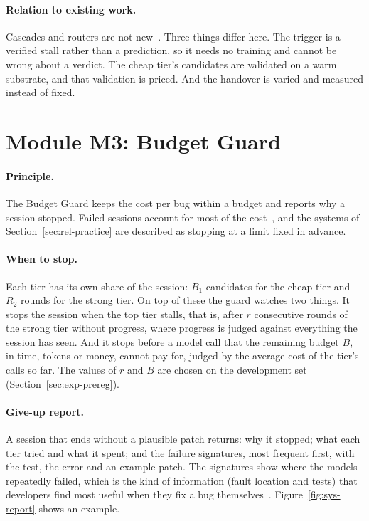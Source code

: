 \paragraph{Relation to existing work.} Cascades and routers are not
new~\citep{chen2023frugalgpt,ong2024routellm,chen2024cascading,gandhi2025strongweak,son2026swerouter,madeyski2026triage}.
Three things differ here. The trigger is a verified stall rather than a
prediction, so it needs no training and cannot be wrong about a verdict. The
cheap tier's candidates are validated on a warm substrate, and that validation
is priced. And the handover is varied and measured instead of fixed.

\section{Module M3: Budget Guard}
\label{sec:sys-guard}

\paragraph{Principle.} The Budget Guard keeps the cost per bug within a budget
and reports why a session stopped. Failed sessions account for most of the
cost~\citep{fan2025sweeffi}, and the systems of
Section~\ref{sec:rel-practice} are described as stopping at a limit fixed in
advance.

\paragraph{When to stop.} Each tier has its own share of the session: $B_1$
candidates for the cheap tier and $R_2$ rounds for the strong tier. On top of
these the guard watches two things. It stops the session when the top tier
stalls, that is, after $r$ consecutive rounds of the strong tier without
progress, where progress is judged against everything the session has seen.
And it stops before a model call that the remaining budget $B$, in time,
tokens or money, cannot pay for, judged by the average cost of the tier's
calls so far. The values of $r$ and $B$ are chosen on the development set
(Section~\ref{sec:exp-prereg}).

\paragraph{Give-up report.} A session that ends without a plausible patch
returns: why it stopped; what each tier tried and what it spent; and the
failure signatures, most frequent first, with the test, the error and an
example patch. The signatures show where the models repeatedly failed, which
is the kind of information (fault location and tests) that developers find
most useful when they fix a bug themselves~\citep{noller2022trust}.
Figure~\ref{fig:sys-report} shows an example.

